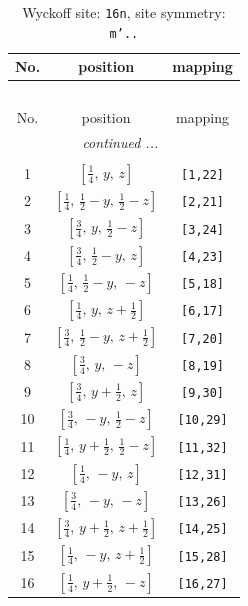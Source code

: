 \documentclass[fleqn,8pt]{jsarticle}
\begin{document}
\renewcommand{\arraystretch}{1.2}
\begin{longtable}{ccc}
\caption{Wyckoff site: {\tt 16n}, site symmetry: {\tt m'..}}
 \\
 \hline \hline
No. & position & mapping \\ \hline \endfirsthead

\multicolumn{2}{l}{\tablename\ \thetable{}} \\
 \hline \hline
No. & position & mapping \\ \hline \endhead

 \hline \hline
\multicolumn{2}{r}{\footnotesize\it continued ...} \\ \endfoot

 \hline \hline
\multicolumn{2}{r}{} \\ \endlastfoot

1 & $\left[ \frac{1}{4},\, y,\, z \right]$ & {\tt [1,22]} \\ \hline
2 & $\left[ \frac{1}{4},\, \frac{1}{2} - y,\, \frac{1}{2} - z \right]$ & {\tt [2,21]} \\ \hline
3 & $\left[ \frac{3}{4},\, y,\, \frac{1}{2} - z \right]$ & {\tt [3,24]} \\ \hline
4 & $\left[ \frac{3}{4},\, \frac{1}{2} - y,\, z \right]$ & {\tt [4,23]} \\ \hline
5 & $\left[ \frac{1}{4},\, \frac{1}{2} - y,\, - z \right]$ & {\tt [5,18]} \\ \hline
6 & $\left[ \frac{1}{4},\, y,\, z + \frac{1}{2} \right]$ & {\tt [6,17]} \\ \hline
7 & $\left[ \frac{3}{4},\, \frac{1}{2} - y,\, z + \frac{1}{2} \right]$ & {\tt [7,20]} \\ \hline
8 & $\left[ \frac{3}{4},\, y,\, - z \right]$ & {\tt [8,19]} \\ \hline
9 & $\left[ \frac{3}{4},\, y + \frac{1}{2},\, z \right]$ & {\tt [9,30]} \\ \hline
10 & $\left[ \frac{3}{4},\, - y,\, \frac{1}{2} - z \right]$ & {\tt [10,29]} \\ \hline
11 & $\left[ \frac{1}{4},\, y + \frac{1}{2},\, \frac{1}{2} - z \right]$ & {\tt [11,32]} \\ \hline
12 & $\left[ \frac{1}{4},\, - y,\, z \right]$ & {\tt [12,31]} \\ \hline
13 & $\left[ \frac{3}{4},\, - y,\, - z \right]$ & {\tt [13,26]} \\ \hline
14 & $\left[ \frac{3}{4},\, y + \frac{1}{2},\, z + \frac{1}{2} \right]$ & {\tt [14,25]} \\ \hline
15 & $\left[ \frac{1}{4},\, - y,\, z + \frac{1}{2} \right]$ & {\tt [15,28]} \\ \hline
16 & $\left[ \frac{1}{4},\, y + \frac{1}{2},\, - z \right]$ & {\tt [16,27]} \\
\end{longtable}
\end{document}

